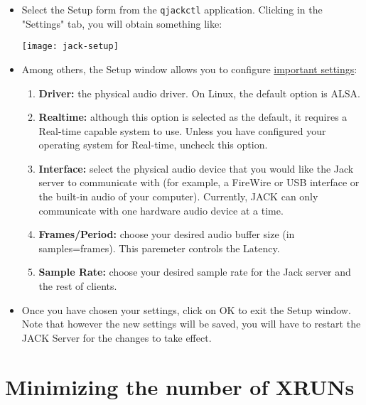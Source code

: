 \begin{itemize}
\item Select the Setup form from the \texttt{qjackctl}
  application. Clicking in the "Settings" tab, you will obtain
  something like:
  \begin{center}
    \texttt{[image: jack-setup]}
  \end{center}
\item Among others, the Setup window allows you to configure
  \href{http://en.flossmanuals.net/ardour/ch015_starting-jack-on-ubuntu/}{important
    settings}:
  \begin{enumerate}
  \item \textbf{Driver:} the physical audio driver. On Linux, the
    default option is ALSA.
  \item \textbf{Realtime:} although this option is selected as the
    default, it requires a Real-time capable system to use. Unless you
    have configured your operating system for Real-time, uncheck this
    option.
  \item \textbf{Interface:} select the physical audio device that you
    would like the Jack server to communicate with (for example, a
    FireWire or USB interface or the built-in audio of your
    computer). Currently, JACK can only communicate with one hardware
    audio device at a time.
  \item \textbf{Frames/Period:} choose your desired audio buffer size
    (in samples=frames). This paremeter controls the Latency.
  \item \textbf{Sample Rate:} choose your desired sample rate for the
    Jack server and the rest of clients.
\end{enumerate}

\item Once you have chosen your settings, click on OK to exit the Setup
window. Note that however the new settings will be saved, you will
have to restart the JACK Server for the changes to take effect.

\end{itemize}


\section{Minimizing the number of XRUNs}


